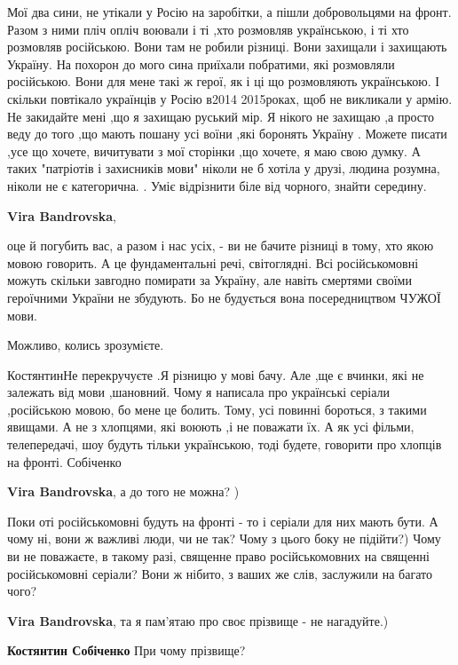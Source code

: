 \begin{itemize}
\begin{itemize}
Мої два сини, не утікали у Росію на заробітки, а пішли добровольцями на фронт.
Разом з ними пліч опліч воювали і ті ,хто розмовляв українською, і ті хто
розмовляв російською. Вони там не робили різниці. Вони захищали і захищають
Україну. На похорон до мого сина приїхали побратими, які розмовляли російською.
Вони для мене такі ж герої, як і ці що розмовляють українською. І скільки
повтікало українців у Росію в2014 2015роках, щоб не викликали у армію. Не
закидайте мені ,що я захищаю руський мір. Я нікого не захищаю ,а просто веду до
того ,що мають пошану усі воїни ,які боронять Україну . Можете писати ,усе що
хочете, вичитувати з мої сторінки ,що хочете, я маю свою думку. А таких
"патріотів і захисників мови" ніколи не б хотіла у друзі, людина розумна,
ніколи не є категорична. . Уміє відрізнити біле від чорного, знайти середину.

\textbf{Vira Bandrovska}, 

оце й погубить вас, а разом і нас усіх, - ви не бачите різниці в тому, хто якою
мовою говорить. А це фундаментальні речі, світоглядні. Всі російськомовні
можуть скільки завгодно помирати за Україну, але навіть смертями своїми
героїчними України не збудують. Бо не будується вона посередництвом ЧУЖОЇ мови.

Можливо, колись зрозумієте.


КостянтинНе перекручуєте .Я різницю у мові бачу. Але ,ще є вчинки, які не
залежать від мови ,шановний. Чому я написала про українські серіали ,російською
мовою, бо мене це болить. Тому, усі повинні бороться, з такими явищами. А не з
хлопцями, які воюють ,і не поважати їх. А як усі фільми, телепередачі, шоу будуть
тільки українською, тоді будете, говорити про хлопців на фронті. Собіченко

\textbf{Vira Bandrovska}, а до того не можна? )

Поки оті російськомовні будуть на фронті - то і серіали для них мають бути. А
чому ні, вони ж важливі люди, чи не так? Чому з цього боку не підійти?) Чому ви
не поважаєте, в такому разі, священне право російськомовних на священні
російськомовні серіали? Вони ж нібито, з ваших же слів, заслужили на багато
чого?

\textbf{Vira Bandrovska}, та я пам'ятаю про своє прізвище - не нагадуйте.)

\textbf{Костянтин Собіченко} При чому прізвище?


\end{itemize}
\end{itemize}
